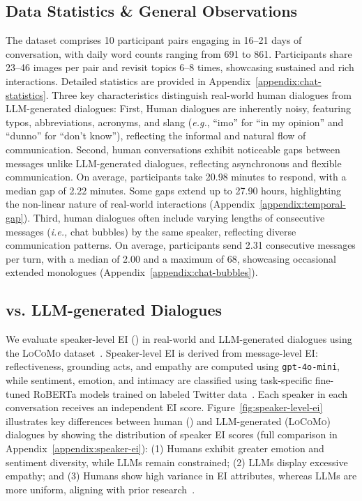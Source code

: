 \subsection{Data Statistics \& General Observations}  
\label{ssec:analysis-data}  
The dataset comprises 10 participant pairs engaging in 16–21 days of conversation, with daily word counts ranging from 691 to 861.
Participants share 23–46 images per pair and revisit topics 6–8 times, showcasing sustained and rich interactions.
Detailed statistics are provided in Appendix~\ref{appendix:chat-statistics}.
Three key characteristics distinguish real-world human dialogues from LLM-generated dialogues:
First, Human dialogues are inherently noisy, featuring typos, abbreviations, acronyms, and slang (\textit{e.g.}, ``imo'' for ``in my opinion'' and ``dunno'' for ``don’t know''), reflecting the informal and natural flow of communication.
Second, human conversations exhibit noticeable gaps between messages unlike LLM-generated dialogues, reflecting asynchronous and flexible communication.
On average, participants take 20.98 minutes to respond, with a median gap of 2.22 minutes.
Some gaps extend up to 27.90 hours, highlighting the non-linear nature of real-world interactions (Appendix~\ref{appendix:temporal-gap}).
Third, human dialogues often include varying lengths of consecutive messages (\textit{i.e.,} chat bubbles) by the same speaker, reflecting diverse communication patterns.
On average, participants send 2.31 consecutive messages per turn, with a median of 2.00 and a maximum of 68, showcasing occasional extended monologues (Appendix~\ref{appendix:chat-bubbles}).

\subsection{vs. LLM-generated Dialogues}  
\label{ssec:analysis-speaker-level-ei}  
We evaluate speaker-level EI () in real-world and LLM-generated dialogues using the \textsc{LoCoMo} dataset~\cite{maharana-etal-2024-evaluating}.
Speaker-level EI is derived from message-level EI: reflectiveness, grounding acts, and empathy are computed using \texttt{gpt-4o-mini}, while sentiment, emotion, and intimacy are classified using task-specific fine-tuned RoBERTa models trained on labeled Twitter data~\cite{antypas2023supertweeteval}.  
Each speaker in each conversation receives an independent EI score.  
Figure~\ref{fig:speaker-level-ei} illustrates key differences between human (\dataset{}) and LLM-generated (\textsc{LoCoMo}) dialogues by showing the distribution of speaker EI scores (full comparison in Appendix~\ref{appendix:speaker-ei}):
(1) Humans exhibit greater emotion and sentiment diversity, while LLMs remain constrained;
(2) LLMs display excessive empathy; and
(3) Humans show high variance in EI attributes, whereas LLMs are more uniform, aligning with prior research~\cite{lee2024language}.  

